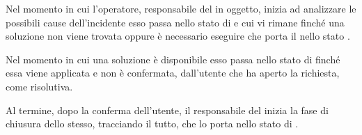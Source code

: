 Nel momento in cui l'operatore, responsabile del  in oggetto, inizia ad analizzare le possibili cause dell'incidente esso passa nello stato di  e cui vi rimane finché una soluzione non viene trovata oppure è necessario eseguire  che porta il  nello stato .

Nel momento in cui una soluzione è disponibile esso passa nello stato di  finché essa viene applicata e non è confermata, dall'utente che ha aperto la richiesta, come risolutiva.

Al termine, dopo la conferma dell'utente, il responsabile del  inizia la fase di chiusura dello stesso, tracciando il tutto, che lo porta nello stato di .